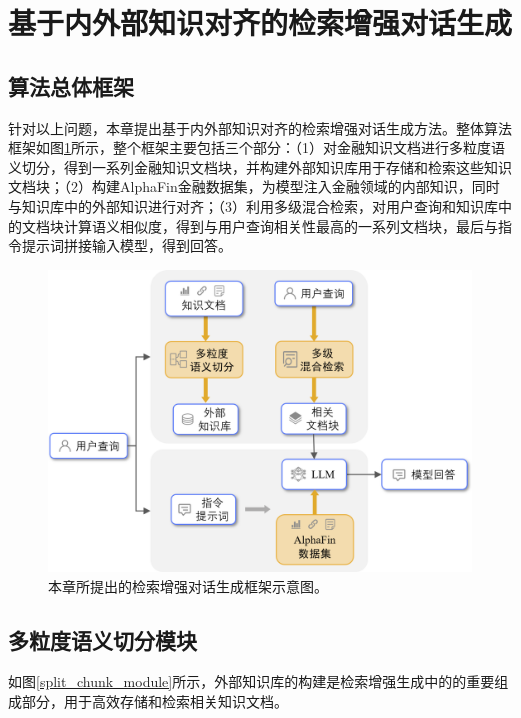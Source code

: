 \section{基于内外部知识对齐的检索增强对话生成}
\subsection{算法总体框架}

针对以上问题，本章提出基于内外部知识对齐的检索增强对话生成方法。整体算法框架如图\ref{rag_framework}所示，整个框架主要包括三个部分：（1）对金融知识文档进行多粒度语义切分，得到一系列金融知识文档块，并构建外部知识库用于存储和检索这些知识文档块；（2）构建AlphaFin金融数据集，为模型注入金融领域的内部知识，同时与知识库中的外部知识进行对齐；（3）利用多级混合检索，对用户查询和知识库中的文档块计算语义相似度，得到与用户查询相关性最高的一系列文档块，最后与指令提示词拼接输入模型，得到回答。

\begin{figure}[htbp]
	\centering
	\includegraphics[scale=0.7]{Fig/rag_framework.png}
	\caption{\label{rag_framework}本章所提出的检索增强对话生成框架示意图。}
\end{figure}

\subsection{多粒度语义切分模块}

如图\ref{split_chunk_module}所示，外部知识库的构建是检索增强生成中的的重要组成部分，用于高效存储和检索相关知识文档。

